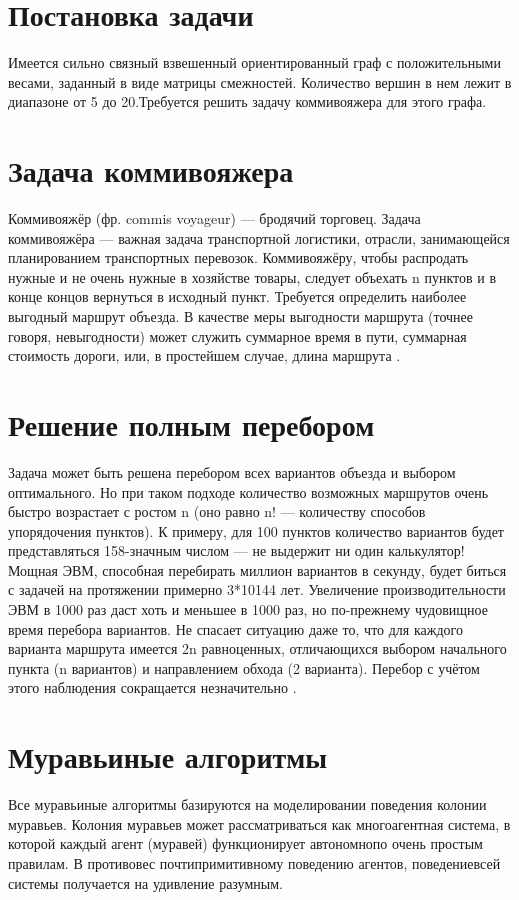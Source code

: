 \documentclass[12pt]{report}
\begin{document}
\section{Постановка задачи} 
Имеется сильно связный взвешенный ориентированный граф \cite{diskr} с положительными весами, заданный в виде матрицы смежностей. Количество вершин в нем лежит в диапазоне от 5 до 20.Требуется решить задачу коммивояжера для этого графа. 
\section{Задача коммивояжера}
 Коммивояжёр (фр. commis voyageur) — бродячий торговец. Задача коммивояжёра — важная задача транспортной логистики, отрасли, занимающейся планированием транспортных перевозок. Коммивояжёру, чтобы распродать нужные и не очень нужные в хозяйстве товары, следует объехать n пунктов и в конце концов вернуться в исходный пункт. Требуется определить наиболее выгодный маршрут объезда. В качестве меры выгодности маршрута (точнее говоря, невыгодности) может служить суммарное время в пути, суммарная стоимость дороги, или, в простейшем случае, длина маршрута \cite{commi2}.

\section{Решение полным перебором}
Задача может быть решена перебором всех вариантов объезда и выбором оптимального. Но при таком подходе количество возможных маршрутов очень быстро возрастает с ростом n (оно равно n! — количеству способов упорядочения пунктов). К примеру, для 100 пунктов количество вариантов будет представляться 158-значным числом — не выдержит ни один калькулятор! Мощная ЭВМ, способная перебирать миллион вариантов в секунду, будет биться с задачей на протяжении примерно 3*10144 лет. Увеличение производительности ЭВМ в 1000 раз даст хоть и меньшее в 1000 раз, но по-прежнему чудовищное время перебора вариантов. Не спасает ситуацию даже то, что для каждого варианта маршрута имеется 2n равноценных, отличающихся выбором начального пункта (n вариантов) и направлением обхода (2 варианта). Перебор с учётом этого наблюдения сокращается незначительно \cite{commi}. %
\section{Муравьиные алгоритмы}
Все муравьиные алгоритмы базируются на моделировании поведения колонии муравьев. Колония муравьев может рассматриваться как многоагентная система, в которой каждый агент (муравей) функционирует автономнопо очень простым правилам. В противовес почтипримитивному поведению агентов, поведениевсей системы получается на удивление разумным.
		
\end{document}
